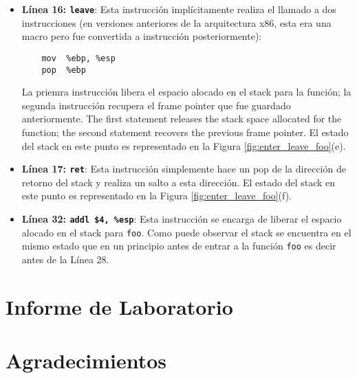 \begin{itemize}
\item \textbf{Línea 16: \texttt{leave}}: Esta instrucción implícitamente realiza el llamado a dos instrucciones (en versiones anteriores de la arquitectura x86, esta era una macro pero fue convertida a instrucción posteriormente):
\begin{verbatim}
    mov  %ebp, %esp
    pop  %ebp
\end{verbatim}
La priemra instrucción libera el espacio alocado en el stack para la función; la segunda instrucción recupera el frame pointer que fue guardado anteriormente.
The first statement releases the stack space allocated for the function; 
the second statement recovers the previous frame pointer. 
El estado del stack en este punto es representado en la Figura  \ref{fig:enter_leave_foo}(e).

\item \textbf{Línea 17: \texttt{ret}}: Esta instrucción simplemente hace un pop de la dirección de retorno del stack y realiza un salto a esta dirección. El estado del stack en este punto es representado en la Figura  \ref{fig:enter_leave_foo}(f).

\item \textbf{Línea 32: \texttt{addl \$4, \%esp}}: Esta instrucción se encarga de liberar el espacio alocado en el stack para {\tt foo}. Como puede observar el stack se encuentra en el mismo estado que en un principio antes de entrar a la función {\tt foo} es decir antes de la Línea 28.

\end{itemize}



\section{Informe de Laboratorio}




\section*{Agradecimientos}






